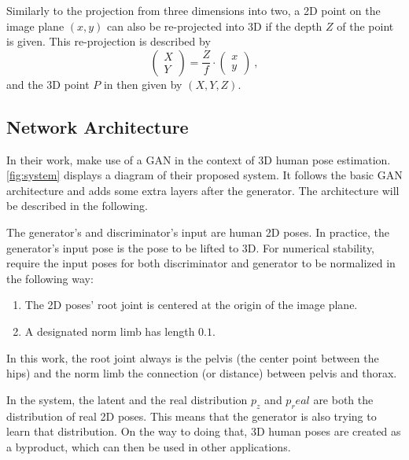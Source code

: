 Similarly to the projection from three dimensions into two, a 2D point on the image plane $(x, y)$ can also be re-projected into 3D if the depth $Z$ of the point is given.
This re-projection is described by
\begin{equation}
	\label{eq:perspective-re-projection}
	\begin{pmatrix}
	X\\
	Y
	\end{pmatrix} = \frac{Z}{f} \cdot
	\begin{pmatrix}
	x\\
	y
	\end{pmatrix} \ ,
\end{equation}
and the 3D point $P$ in then given by $(X, Y, Z)$.

\subsection{Network Architecture}



In their work, \citet{drover18} make use of a GAN in the context of 3D human pose estimation.
\autoref{fig:system} displays a diagram of their proposed system.
It follows the basic GAN architecture and adds some extra layers after the generator.
The architecture will be described in the following.

The generator's and discriminator's input are human 2D poses.
In practice, the generator's input pose is the pose to be lifted to 3D.
For numerical stability, \citet{drover18} require the input poses for both discriminator and generator to be normalized in the following way:
\begin{enumerate}[label=(\Alph*)]
	\item The 2D poses' root joint is centered at the origin of the image plane.
	\item A designated norm limb has length $0.1$.
\end{enumerate}
In this work, the root joint always is the pelvis (the center point between the hips) and the norm limb the connection (or distance) between pelvis and thorax.

In the system, the latent and the real distribution $p_z$ and $p_real$ are both the distribution of real 2D poses.
This means that the generator is also trying to learn that distribution.
On the way to doing that, 3D human poses are created as a byproduct, which can then be used in other applications.

